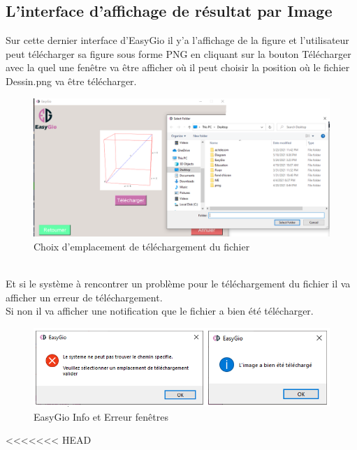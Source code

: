 \documentclass[a4paper]{report}
\begin{document}
\subsection{L'interface d'affichage de résultat par Image}
Sur cette dernier interface d'EasyGio il y'a l'affichage de la figure et l'utilisateur peut télécharger sa figure sous forme PNG en cliquant sur la bouton Télécharger avec la quel une fenêtre va être afficher où il peut choisir la position où le fichier Dessin.png va être télécharger.\\
\begin{figure}[!h]
    \centering
    \includegraphics[width=14cm]{images/CubeP.PNG}
    \caption{Choix d'emplacement de téléchargement du fichier}
    \label{fig:Choix d'emplacement de téléchargement du fichier}
\end{figure}\\
Et si le système à rencontrer un problème pour le téléchargement du fichier il va afficher un erreur de téléchargement.\\
Si non il va afficher une notification que le fichier a bien été télécharger.\\
\begin{figure}[!h]
    \centering
    \includegraphics[width=14cm]{images/nots.PNG}
    \caption{EasyGio Info et Erreur fenêtres}
    \label{fig:EasyGio Info et Erreur fenêtres}
\end{figure}
<<<<<<< HEAD
\end{document}

